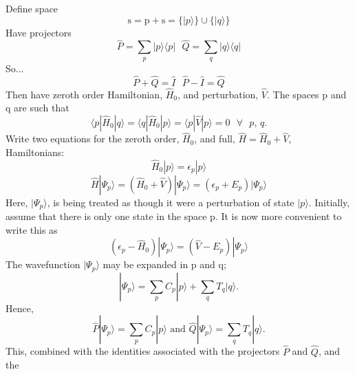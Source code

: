 \documentclass[12pt]{article}
\begin{document}
Define space 
\begin{equation}
\mathrm{s} = \mathrm{p} + \mathrm{s} = \{ |p\rangle \} \cup \{|q\rangle \}
\end{equation}
Have projectors
\begin{equation}
\hat{P} =\sum_{p} |p\rangle \langle p | 
\text{ \ \ \ \ \ \ \ \ \ }
\hat{Q} =\sum_{q} |q\rangle \langle q | 
\end{equation}
So...
\begin{equation}
\hat{P}+\hat{Q} = \hat{I}
\text{\ \ \ \ \ \ \ \ \ }
\hat{P}-\hat{I} = \hat{Q}
\end{equation}
Then have zeroth order Hamiltonian, $\hat{H}_{0}$, and perturbation, $\hat{V}$. The spaces $\mathrm{p}$ and $\mathrm{q}$ are such that
\begin{equation}
\langle p | \hat{H}_{0} | q \rangle  = 
\langle q | \hat{H}_{0} | p \rangle  = 
\langle p | \hat{V} | p \rangle  =  0 \text{ \ \ \ } \forall \text{ \ }p\text{,\ }q  . 
\label{eqn:space_props}
\end{equation}
Write two equations for the zeroth order, $\hat{H}_{0}$, and full, $\hat{H} = \hat{H}_{0} + \hat{V}$, Hamiltonians:
\begin{equation}
\hat{H}_{0} | p \rangle  = \epsilon_{p} |p \rangle
\end{equation}
\begin{equation}
\hat{H}|\Psi_{p} \rangle =( \hat{H}_{0}+\hat{V} )| \Psi_{p} \rangle  = (\epsilon_{p}+E_{p})|\Psi_{p} \rangle
\end{equation}
Here, $|\Psi_{p}\rangle$, is being treated as though it were a perturbation of state $|p\rangle$. Initially, 
assume that there is only one state in the space $\mathrm{p}$. It is now more convenient to write this as
\begin{equation}
(\epsilon_{p}-\hat{H}_{0} )| \Psi_{p} \rangle  = (\hat{V}-E_{p})|\Psi_{p} \rangle
\end{equation}
The wavefunction $|\Psi_{p} \rangle$ may be expanded in $\mathrm{p}$ and $\mathrm{q}$;
\begin{equation}
| \Psi_{p} \rangle  = \sum_{p} C_{p}|p\rangle + \sum_{q} T_{q}|q\rangle.
\end{equation}
Hence,
\begin{equation}
\hat{P} | \Psi_{p} \rangle  = \sum_{p} C_{p}|p\rangle
\text{ \ \ \ \  and \ \ \ \ }
\hat{Q} | \Psi_{p} \rangle  = \sum_{q} T_{q}|q\rangle .
\end{equation}
This, combined with the identities associated with the projectors $\hat{P}$ and $\hat{Q}$, and the
\end{document}
